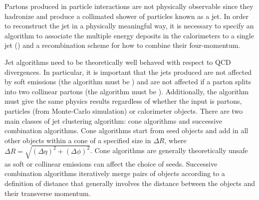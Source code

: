 Partons produced in particle interactions are not physically observable since
they hadronize and produce a collimated shower of particles known as a jet. In
order to reconstruct the jet in a physically meaningful way, it is necessary to
specify an algorithm to associate the multiple energy deposits in the calorimeters
to a single jet () and a recombination scheme for how to combine their
four-momentum. 


Jet algorithms need to be theoretically well behaved with respect to QCD
divergences. In particular, it is important that the jets produced are not
affected by soft emissions (the algorithm must be ) and
are not affected if a parton splits into two collinear partons (the algorithm
must be ). Additionally, the algorithm must give the same
physics results regardless of whether the input is partons, particles (from
Monte-Carlo simulation) or calorimeter objects. There are two main classes of
jet clustering algorithm: cone algorithms and successive combination algorithms.
Cone algorithms start from seed objects and add in all other objects within a
cone of a specified size in $\Delta R$, where $\Delta R = \sqrt{(\Delta \eta)^{2} + (\Delta
\phi)^{2}} $. Cone algorithms are generally theoretically unsafe as soft or
collinear emissions can affect the choice of seeds. Successive combination
algorithms iteratively merge pairs of objects according to a definition of distance that
generally involves the distance between the objects and their transverse
momentum.

